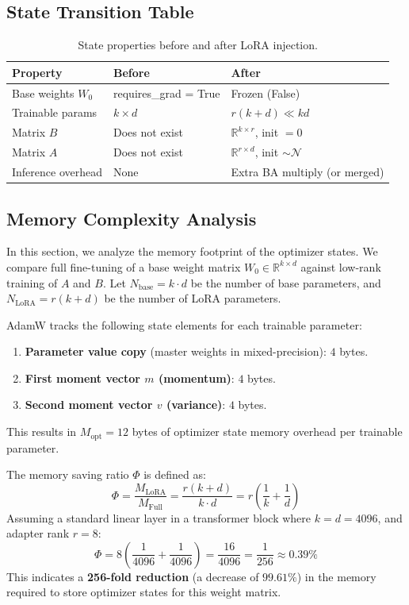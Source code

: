 \subsection{State Transition Table}
\begin{table}[h]\centering
\begin{tabular}{lll}\toprule
\textbf{Property} & \textbf{Before} & \textbf{After}\\\midrule
Base weights $W_0$ & requires\_grad = True & Frozen (False)\\
Trainable params & $k \times d$ & $r(k+d) \ll kd$\\
Matrix $B$ & Does not exist & $\mathbb{R}^{k\times r}$, init $= 0$\\
Matrix $A$ & Does not exist & $\mathbb{R}^{r\times d}$, init $\sim \mathcal{N}$\\
Inference overhead & None & Extra BA multiply (or merged)\\\bottomrule
\end{tabular}
\caption{State properties before and after LoRA injection.}
\end{table}

\subsection{Memory Complexity Analysis}
In this section, we analyze the memory footprint of the optimizer states. We compare full fine-tuning of a base weight matrix $W_0 \in \mathbb{R}^{k \times d}$ against low-rank training of $A$ and $B$. Let $N_{\text{base}} = k \cdot d$ be the number of base parameters, and $N_{\text{LoRA}} = r(k + d)$ be the number of LoRA parameters.

AdamW tracks the following state elements for each trainable parameter:
\begin{enumerate}
  \item \textbf{Parameter value copy} (master weights in mixed-precision): $4$ bytes.
  \item \textbf{First moment vector $m$ (momentum)}: $4$ bytes.
  \item \textbf{Second moment vector $v$ (variance)}: $4$ bytes.
\end{enumerate}
This results in $M_{\text{opt}} = 12$ bytes of optimizer state memory overhead per trainable parameter.

\noindent The memory saving ratio $\Phi$ is defined as:
\begin{equation}
  \Phi = \frac{M_{\text{LoRA}}}{M_{\text{Full}}} = \frac{r(k+d)}{k \cdot d} = r \left( \frac{1}{k} + \frac{1}{d} \right)
\end{equation}
Assuming a standard linear layer in a transformer block where $k = d = 4096$, and adapter rank $r = 8$:
\begin{equation}
  \Phi = 8 \left( \frac{1}{4096} + \frac{1}{4096} \right) = \frac{16}{4096} = \frac{1}{256} \approx 0.39\%
\end{equation}
This indicates a \textbf{256-fold reduction} (a decrease of $99.61\%$) in the memory required to store optimizer states for this weight matrix.



